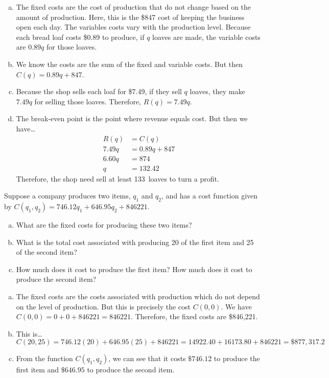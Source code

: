\documentclass[11pt,letterpaper]{article}
\begin{document}
\sol 
\begin{enumerate}[(a)]
\item The fixed costs are the cost of production that do not change based on the amount of production. Here, this is the \$847 cost of keeping the business open each day. The variables costs vary with the production level. Because each bread loaf costs \$0.89 to produce, if $q$ loaves are made, the variable costs are $0.89q$ for those loaves. \pspace

\item We know the costs are the sum of the fixed and variable costs. But then $C(q)= 0.89q + 847$. \pspace

\item Because the shop sells each loaf for \$7.49, if they sell $q$ loaves, they make $7.49q$ for selling those loaves. Therefore, $R(q)= 7.49q$. \pspace

\item The break-even point is the point where revenue equals cost. But then we have\dots
	\[
	\begin{aligned}
	R(q)&= C(q) \\[0.3cm]
	7.49q&= 0.89q + 847 \\[0.3cm]
	6.60q&= 874 \\[0.3cm]
	q&= 132.42
	\end{aligned}
	\]
Therefore, the shop need sell at least 133~loaves to turn a profit. 
\end{enumerate}



\newpage



 Suppose a company produces two items, $q_1$ and $q_2$, and has a cost function given by $C(q_1, q_2)= 746.12q_1 + 646.95q_2 + 846221$. 
	\begin{enumerate}[(a)]
	\item What are the fixed costs for producing these two items?
	\item What is the total cost associated with producing 20 of the first item and 25 of the second item?
	\item How much does it cost to produce the first item? How much does it cost to produce the second item?
	\end{enumerate} \pspace

\sol 
\begin{enumerate}[(a)]
\item The fixed costs are the costs associated with production which do not depend on the level of production. But this is precisely the cost $C(0, 0)$. We have $C(0, 0)= 0 + 0 + 846221= 846221$. Therefore, the fixed costs are \$846,221. \pspace

\item This is\dots
	\[
	C(20, 25)= 746.12(20) + 646.95(25) + 846221= 14922.40 + 16173.80 + 846221= \$877,317.2
	\] \pspace

\item From the function $C(q_1, q_2)$, we can see that it costs $\$746.12$ to produce the first item and $\$646.95$ to produce the second item. 
\end{enumerate}
\end{document}

